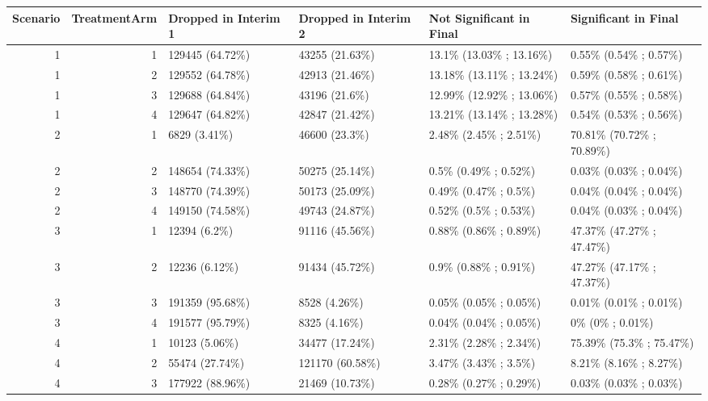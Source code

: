 \documentclass[11pt, a4paper]{article}\usepackage[]{graphicx}\usepackage[]{xcolor}
\begin{document}
{\begin{landscape}
\begin{table}[ht]
\centering
\begin{tabular}{rrllll}
  \hline
Scenario & TreatmentArm & Dropped in Interim 1 & Dropped in Interim 2 & Not Significant in Final & Significant in Final \\ 
  \hline
  1 &   1 & 129445 (64.72\%) & 43255 (21.63\%) & 13.1\% (13.03\% ; 13.16\%) & 0.55\% (0.54\% ; 0.57\%) \\ 
    1 &   2 & 129552 (64.78\%) & 42913 (21.46\%) & 13.18\% (13.11\% ; 13.24\%) & 0.59\% (0.58\% ; 0.61\%) \\ 
    1 &   3 & 129688 (64.84\%) & 43196 (21.6\%) & 12.99\% (12.92\% ; 13.06\%) & 0.57\% (0.55\% ; 0.58\%) \\ 
    1 &   4 & 129647 (64.82\%) & 42847 (21.42\%) & 13.21\% (13.14\% ; 13.28\%) & 0.54\% (0.53\% ; 0.56\%) \\ 
   \hline 
  2 &   1 & 6829 (3.41\%) & 46600 (23.3\%) & 2.48\% (2.45\% ; 2.51\%) & 70.81\% (70.72\% ; 70.89\%) \\ 
    2 &   2 & 148654 (74.33\%) & 50275 (25.14\%) & 0.5\% (0.49\% ; 0.52\%) & 0.03\% (0.03\% ; 0.04\%) \\ 
    2 &   3 & 148770 (74.39\%) & 50173 (25.09\%) & 0.49\% (0.47\% ; 0.5\%) & 0.04\% (0.04\% ; 0.04\%) \\ 
    2 &   4 & 149150 (74.58\%) & 49743 (24.87\%) & 0.52\% (0.5\% ; 0.53\%) & 0.04\% (0.03\% ; 0.04\%) \\ 
   \hline 
  3 &   1 & 12394 (6.2\%) & 91116 (45.56\%) & 0.88\% (0.86\% ; 0.89\%) & 47.37\% (47.27\% ; 47.47\%) \\ 
    3 &   2 & 12236 (6.12\%) & 91434 (45.72\%) & 0.9\% (0.88\% ; 0.91\%) & 47.27\% (47.17\% ; 47.37\%) \\ 
    3 &   3 & 191359 (95.68\%) & 8528 (4.26\%) & 0.05\% (0.05\% ; 0.05\%) & 0.01\% (0.01\% ; 0.01\%) \\ 
    3 &   4 & 191577 (95.79\%) & 8325 (4.16\%) & 0.04\% (0.04\% ; 0.05\%) & 0\% (0\% ; 0.01\%) \\ 
   \hline 
  4 &   1 & 10123 (5.06\%) & 34477 (17.24\%) & 2.31\% (2.28\% ; 2.34\%) & 75.39\% (75.3\% ; 75.47\%) \\ 
    4 &   2 & 55474 (27.74\%) & 121170 (60.58\%) & 3.47\% (3.43\% ; 3.5\%) & 8.21\% (8.16\% ; 8.27\%) \\ 
    4 &   3 & 177922 (88.96\%) & 21469 (10.73\%) & 0.28\% (0.27\% ; 0.29\%) & 0.03\% (0.03\% ; 0.03\%) \\ 

\end{tabular}
\end{table}
\end{landscape}}
\end{document}

